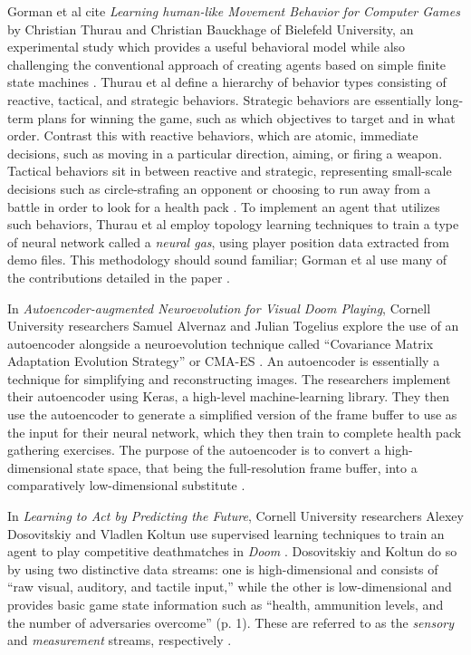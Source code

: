 Gorman et al cite {\it Learning human-like Movement Behavior for Computer Games} by Christian Thurau and Christian Bauckhage of Bielefeld University, an experimental study which provides a useful behavioral model while also challenging the conventional approach of creating agents based on simple finite state machines \cite{Thurau:2004}. Thurau et al define a hierarchy of behavior types consisting of reactive, tactical, and strategic behaviors. Strategic behaviors are essentially long-term plans for winning the game, such as which objectives to target and in what order. Contrast this with reactive behaviors, which are atomic, immediate decisions, such as moving in a particular direction, aiming, or firing a weapon. Tactical behaviors sit in between reactive and strategic, representing small-scale decisions such as circle-strafing an opponent or choosing to run away from a battle in order to look for a health pack \cite{Gorman:2006}. To implement an agent that utilizes such behaviors, Thurau et al employ topology learning techniques to train a type of neural network called a {\it neural gas}, using player position data extracted from demo files. This methodology should sound familiar; Gorman et al use many of the contributions detailed in the paper \cite{Thurau:2004}.

In {\it Autoencoder-augmented Neuroevolution for Visual Doom Playing}, Cornell University researchers Samuel Alvernaz and Julian Togelius explore the use of an autoencoder alongside a neuroevolution technique called ``Covariance Matrix Adaptation Evolution Strategy'' or CMA-ES \cite{Alvernaz:2017}. An autoencoder is essentially a technique for simplifying and reconstructing images. The researchers implement their autoencoder using Keras, a high-level machine-learning library. They then use the autoencoder to generate a simplified version of the frame buffer to use as the input for their neural network, which they then train to complete health pack gathering exercises. The purpose of the autoencoder is to convert a high-dimensional state space, that being the full-resolution frame buffer, into a comparatively low-dimensional substitute \cite{Alvernaz:2017}.

In {\it Learning to Act by Predicting the Future}, Cornell University researchers Alexey Dosovitskiy and Vladlen Koltun use supervised learning techniques to train an agent to play competitive deathmatches in {\it Doom} \cite{Dosovitskiy:2016}. Dosovitskiy and Koltun do so by using two distinctive data streams: one is high-dimensional and consists of ``raw visual, auditory, and tactile input,'' while the other is low-dimensional and provides basic game state information such as ``health, ammunition levels, and the number of adversaries overcome'' (p. 1). These are referred to as the {\it sensory} and {\it measurement} streams, respectively \cite{Dosovitskiy:2016}.

